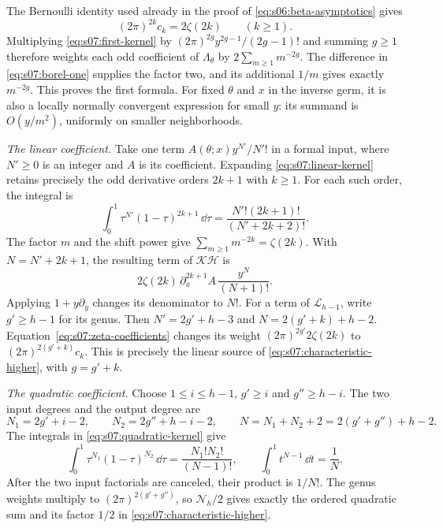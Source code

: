 \begin{prf}
The Bernoulli identity used already in the proof of
\eqref{eq:s06:beta-asymptotics} gives
\begin{equation}\label{eq:s07:zeta-coefficients}
 (2\pi)^{2k}c_k=2\zeta(2k)\qquad(k\geq1).
\end{equation}
Multiplying \eqref{eq:s07:first-kernel} by
$(2\pi)^{2g}y^{2g-1}/(2g-1)!$ and summing $g\geq1$ therefore
weights each odd coefficient of $\Lambda_\theta$ by
$2\sum_{m\geq1}m^{-2g}$. The difference in
\eqref{eq:s07:borel-one} supplies the factor two, and its additional
$1/m$ gives exactly $m^{-2g}$. This proves the first formula.
For fixed $\theta$ and $x$ in the inverse germ, it is also a locally
normally convergent expression for small $y$: its summand is
$O(y/m^2)$, uniformly on smaller neighborhoods.

\smallskip\noindent
\emph{The linear coefficient.}
Take one term $A(\theta;x)y^{N'}/N'!$ in a formal input, where
$N'\geq0$ is an integer and $A$ is its coefficient. Expanding
\eqref{eq:s07:linear-kernel} retains precisely the odd derivative
orders $2k+1$ with $k\geq1$. For each such order, the integral is
\[
 \int_0^1\tau^{N'}(1-\tau)^{2k+1}\,\dd\tau
                   =\frac{N'!(2k+1)!}{(N'+2k+2)!}.
\]
The factor $m$ and the shift power give
$\sum_{m\geq1}m^{-2k}=\zeta(2k)$. With
$N=N'+2k+1$, the resulting term of $\mathcal K\mathcal H$ is
\[
 2\zeta(2k)\,\partial_x^{2k+1}A\,
                              \frac{y^N}{(N+1)!}.
\]
Applying $1+y\partial_y$ changes its denominator to $N!$.
For a term of $\mathcal L_{h-1}$, write
$g'\geq h-1$ for its genus. Then
$N'=2g'+h-3$ and $N=2(g'+k)+h-2$.
Equation~\eqref{eq:s07:zeta-coefficients} changes its weight
$(2\pi)^{2g'}2\zeta(2k)$ to
$(2\pi)^{2(g'+k)}c_k$. This is precisely the linear source of
\eqref{eq:s07:characteristic-higher}, with $g=g'+k$.

\smallskip\noindent
\emph{The quadratic coefficient.}
Choose $1\leq i\leq h-1$, $g'\geq i$ and $g''\geq h-i$.
The two input degrees and the output degree are
\[
 N_1=2g'+i-2,\qquad N_2=2g''+h-i-2,\qquad
 N=N_1+N_2+2=2(g'+g'')+h-2.
\]
The integrals in \eqref{eq:s07:quadratic-kernel} give
\[
 \int_0^1\tau^{N_1}(1-\tau)^{N_2}\,\dd\tau
       =\frac{N_1!N_2!}{(N-1)!},\qquad
 \int_0^1t^{N-1}\,\dd t=\frac1N.
\]
After the two input factorials are canceled, their product is
$1/N!$. The genus weights multiply to
$(2\pi)^{2(g'+g'')}$, so $\mathcal N_h/2$ gives exactly the
ordered quadratic sum and its factor $1/2$ in
\eqref{eq:s07:characteristic-higher}.


\end{prf}
